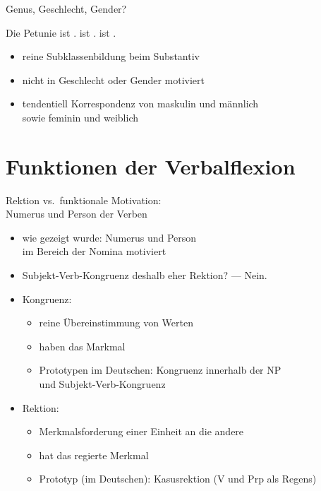 \begin{frame}
  {Genus, Geschlecht, Gender?}
  \pause
  \begin{exe}
    \ex \label{ex:genus039}
    \begin{xlist}
      \ex \alert{Die Petunie} ist .
      \ex {} ist .
      \ex {} ist .
    \end{xlist}
  \end{exe}
  \pause
  \Halbzeile
  \begin{itemize}[<+->]
    \item reine Subklassenbildung beim Substantiv
    \item nicht in Geschlecht oder Gender motiviert
    \item tendentiell Korrespondenz von maskulin und männlich\\
      sowie feminin und weiblich
  \end{itemize}
\end{frame}

\section{Funktionen der Verbalflexion}

\begin{frame}
  {Rektion vs.\ funktionale Motivation:\\
  Numerus und Person der Verben}
  \pause
  \begin{itemize}[<+->]
    \item wie gezeigt wurde: \alert{Numerus} und \alert{Person}\\
      im Bereich der Nomina motiviert
    \item Subjekt-Verb-Kongruenz deshalb eher \alert{Rektion}? --- Nein.
      \Halbzeile
    \item Kongruenz:
      \begin{itemize}[<+->]
        \item reine \alert{Übereinstimmung von Werten}
        \item {} haben das Markmal
        \item Prototypen im Deutschen: \alert{Kongruenz innerhalb der NP}\\
          und \alert{Subjekt-Verb-Kongruenz}
      \end{itemize}
      \Halbzeile
    \item Rektion:
      \begin{itemize}[<+->]
        \item \alert{Merkmalsforderung} einer Einheit an die andere
        \item {} hat das regierte Merkmal 
        \item Prototyp (im Deutschen): \alert{Kasusrektion} (V und Prp als Regens)
      \end{itemize}
  \end{itemize}
\end{frame}

